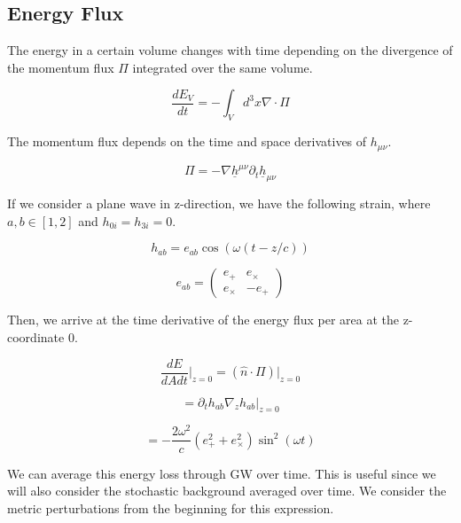 \subsection{Energy Flux}

The energy in a certain volume changes with time depending on the divergence of the momentum flux $\Pi$ integrated over the same volume.

\begin{equation}
    \frac{dE_V}{dt}=-\int_V d^3x \nabla\cdot \Pi
\end{equation}

The momentum flux depends on the time and space derivatives of $h_{\mu\nu}$.

\begin{equation}
    \Pi=-\nabla \underline{h}^{\mu\nu}\partial_t \underline{h}_{\mu\nu}
\end{equation}

If we consider a plane wave in z-direction, we have the following strain, where $a,b \in [1, 2]$ and $h_{0i}=h_{3i}=0$.

\begin{equation}
    h_{ab} =e_{ab}\cos(\omega(t-z/c))
\end{equation}

\begin{equation}
    e_{ab}=
    \begin{pmatrix}
        e_+ & e_\times \\
        e_\times & -e_+
    \end{pmatrix}
\end{equation}

Then, we arrive at the time derivative of the energy flux per area at the z-coordinate 0.

\begin{equation}
    \frac{dE}{dAdt}\left.\right|_{z=0} = (\hat{n}\cdot \Pi)\left.\right|_{z=0}
\end{equation}

\begin{equation}
    = \partial_t h_{ab}\nabla_z h_{ab}\left.\right|_{z=0}
\end{equation}

\begin{equation}
    = -\frac{2\omega^2}{c}(e_+^2 + e_\times^2)\sin^2(\omega t)
\end{equation}

We can average this energy loss through GW over time. This is useful since we will also consider the stochastic background averaged over time. We consider the metric perturbations from the beginning for this expression.

